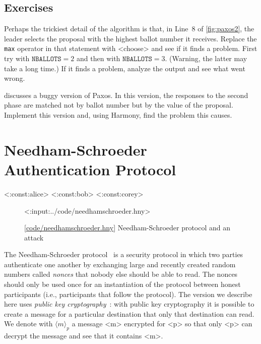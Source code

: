 \documentclass{report}
\newcommand{\harmonylink}[1]{%
[\href{https://harmony.cs.cornell.edu/#1}{\underline{#1}}]%
}
\newenvironment{code}{
\tcolorbox
}{
\endtcolorbox
}
\begin{document}
\section*{Exercises}
\begin{problems}
\item Perhaps the trickiest detail of the algorithm is that, in Line~8
of \autoref{fig:paxos2}, the leader selects the proposal with the highest
ballot number it receives.  Replace the \texttt{max} operator in that statement
with <{choose}> and see if it finds a problem.  First try with
$\texttt{NBALLOTS} = 2$ and then with $\texttt{NBALLOTS} = 3$.
(Warning, the latter may take a long time.)  If it finds a problem,
analyze the output and see what went wrong.
\item \cite{MWA19} discusses a buggy version of Paxos.  In this version,
the responses to the second phase are matched not by ballot number but
by the value of the proposal.  Implement this version and, using Harmony,
find the problem this causes.
\end{problems}

\chapter{Needham-Schroeder Authentication Protocol}
\label{ch:ns}

<{:const:alice}>
<{:const:bob}>
<{:const:corey}>

\begin{figure}
\begin{code}
<{:input:../code/needhamschroeder.hny}>
\end{code}
\caption{\harmonylink{code/needhamschroeder.hny} Needham-Schroeder protocol and an attack}
\label{fig:ns}
\end{figure}

The Needham-Schroeder protocol~\cite{NS78} is a security protocol in which two parties
authenticate one another by exchanging large and recently created random numbers
called \emph{nonces} that nobody else should be able to read.
The nonces should only be used once for an instantiation of the protocol between
honest participants (i.e., participants that follow the protocol).
The version we describe here uses \emph{public key cryptography}~\cite{DH76}: with public key
cryptography it is possible to create a message for a particular destination that
only that destination can read.  We denote with $\langle m \rangle_p$ a message
<{m}> encrypted for <{p}> so that only <{p}> can decrypt the message and see that it contains <{m}>.
\end{document}
